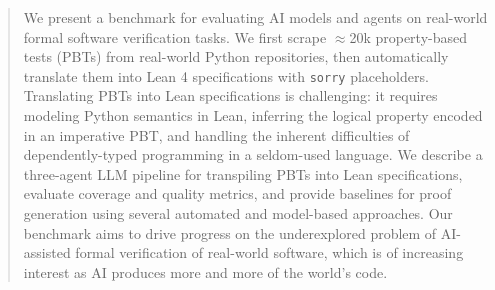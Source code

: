 \begin{abstract}
We present a benchmark for evaluating AI models and agents
 on real-world formal software verification tasks.
We first scrape $\approx$20k property-based tests (PBTs) from 
real-world Python repositories, then automatically translate them into Lean 4 specifications with \texttt{sorry} placeholders. 
Translating PBTs into Lean specifications is challenging: it requires modeling Python semantics in Lean, inferring the logical property encoded in an imperative PBT, and handling the inherent difficulties of dependently-typed programming in a seldom-used language. 
We describe a three-agent LLM pipeline for transpiling PBTs into Lean specifications, evaluate coverage and quality metrics, and provide baselines for proof generation using several automated and model-based approaches. Our benchmark aims to drive progress on the underexplored problem of AI-assisted formal verification of real-world software, which is of increasing interest as AI produces more and more of the world's code.
\end{abstract}